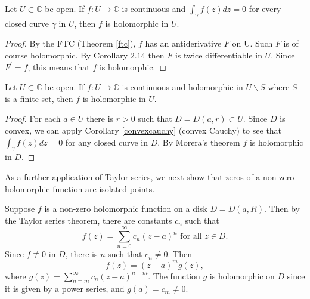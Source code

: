 \documentclass[egregdoesnotlikesansseriftitles,a4paper]{scrartcl}
\begin{document}
\begin{theorem}\label{morera}
     Let $U \subset \mathbb{C}$ be open. If $f: U \rightarrow \mathbb{C}$ is continuous and $\int_{\gamma} f(z) d z=0$ for every closed curve $\gamma$ in $U$, then $f$ is holomorphic in $U$.
     \begin{proof}
          By the FTC (Theorem \ref{ftc}), $f$ has an antiderivative $F$ on U. Such $F$ is of course holomorphic. By Corollary $2.14$ then $F$ is twice differentiable in $U$. Since $F^{\prime}=f$, this means that $f$ is holomorphic.
     \end{proof}
\end{theorem}
\begin{corollary}
     Let $U \subset \mathbb{C}$ be open. If $f: U \rightarrow \mathbb{C}$ is continuous and holomorphic in $U \backslash S$ where $S$ is a finite set, then $f$ is holomorphic in $U$.
     \begin{proof}
          For each $a \in U$ there is $r>0$ such that $D=D(a, r) \subset U$. Since $D$ is convex, we can apply Corollary \ref{convexcauchy} (convex Cauchy) to see that $\int_{\gamma} f(z) d z=0$ for any closed curve in $D$. By Morera's theorem $f$ is holomorphic in $D$.
     \end{proof}
\end{corollary}
As a further application of Taylor series, we next show that zeros of a non-zero holomorphic function are isolated points.

Suppose $f$ is a non-zero holomorphic function on a disk $D=D(a, R)$. Then by the Taylor series theorem, there are constants $c_{n}$ such that \[
     f(z)=\sum_{n=0}^{\infty} c_{n}(z-a)^{n} \text{ for all } z \in D
.\] 
Since $f \not \equiv 0$ in $D$, there is $n$ such that $c_{n} \neq 0 .$ Then \[
     f(z)=(z-a)^{m} g(z)
,\] 
where $g(z)=\sum_{n=m}^{\infty} c_{n}(z-a)^{n-m}$. The function $g$ is holomorphic on $D$ since it is given by a power series, and $g(a)=c_{m} \neq 0$.
\end{document}
